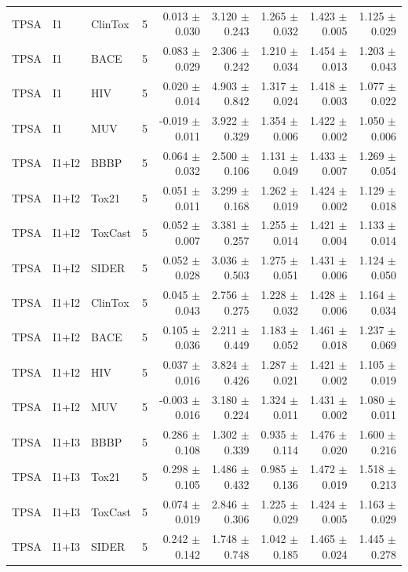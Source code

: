 \begin{landscape}
\begin{longtable}{lllrrrrrr}
TPSA & I1 & ClinTox & 5 & 0.013 $\pm$ 0.030 & 3.120 $\pm$ 0.243 & 1.265 $\pm$ 0.032 & 1.423 $\pm$ 0.005 & 1.125 $\pm$ 0.029 \\
TPSA & I1 & BACE & 5 & 0.083 $\pm$ 0.029 & 2.306 $\pm$ 0.242 & 1.210 $\pm$ 0.034 & 1.454 $\pm$ 0.013 & 1.203 $\pm$ 0.043 \\
TPSA & I1 & HIV & 5 & 0.020 $\pm$ 0.014 & 4.903 $\pm$ 0.842 & 1.317 $\pm$ 0.024 & 1.418 $\pm$ 0.003 & 1.077 $\pm$ 0.022 \\
TPSA & I1 & MUV & 5 & -0.019 $\pm$ 0.011 & 3.922 $\pm$ 0.329 & 1.354 $\pm$ 0.006 & 1.422 $\pm$ 0.002 & 1.050 $\pm$ 0.006 \\
TPSA & I1+I2 & BBBP & 5 & 0.064 $\pm$ 0.032 & 2.500 $\pm$ 0.106 & 1.131 $\pm$ 0.049 & 1.433 $\pm$ 0.007 & 1.269 $\pm$ 0.054 \\
TPSA & I1+I2 & Tox21 & 5 & 0.051 $\pm$ 0.011 & 3.299 $\pm$ 0.168 & 1.262 $\pm$ 0.019 & 1.424 $\pm$ 0.002 & 1.129 $\pm$ 0.018 \\
TPSA & I1+I2 & ToxCast & 5 & 0.052 $\pm$ 0.007 & 3.381 $\pm$ 0.257 & 1.255 $\pm$ 0.014 & 1.421 $\pm$ 0.004 & 1.133 $\pm$ 0.014 \\
TPSA & I1+I2 & SIDER & 5 & 0.052 $\pm$ 0.028 & 3.036 $\pm$ 0.503 & 1.275 $\pm$ 0.051 & 1.431 $\pm$ 0.006 & 1.124 $\pm$ 0.050 \\
TPSA & I1+I2 & ClinTox & 5 & 0.045 $\pm$ 0.043 & 2.756 $\pm$ 0.275 & 1.228 $\pm$ 0.032 & 1.428 $\pm$ 0.006 & 1.164 $\pm$ 0.034 \\
TPSA & I1+I2 & BACE & 5 & 0.105 $\pm$ 0.036 & 2.211 $\pm$ 0.449 & 1.183 $\pm$ 0.052 & 1.461 $\pm$ 0.018 & 1.237 $\pm$ 0.069 \\
TPSA & I1+I2 & HIV & 5 & 0.037 $\pm$ 0.016 & 3.824 $\pm$ 0.426 & 1.287 $\pm$ 0.021 & 1.421 $\pm$ 0.002 & 1.105 $\pm$ 0.019 \\
TPSA & I1+I2 & MUV & 5 & -0.003 $\pm$ 0.016 & 3.180 $\pm$ 0.224 & 1.324 $\pm$ 0.011 & 1.431 $\pm$ 0.002 & 1.080 $\pm$ 0.011 \\
TPSA & I1+I3 & BBBP & 5 & 0.286 $\pm$ 0.108 & 1.302 $\pm$ 0.339 & 0.935 $\pm$ 0.114 & 1.476 $\pm$ 0.020 & 1.600 $\pm$ 0.216 \\
TPSA & I1+I3 & Tox21 & 5 & 0.298 $\pm$ 0.105 & 1.486 $\pm$ 0.432 & 0.985 $\pm$ 0.136 & 1.472 $\pm$ 0.019 & 1.518 $\pm$ 0.213 \\
TPSA & I1+I3 & ToxCast & 5 & 0.074 $\pm$ 0.019 & 2.846 $\pm$ 0.306 & 1.225 $\pm$ 0.029 & 1.424 $\pm$ 0.005 & 1.163 $\pm$ 0.029 \\
TPSA & I1+I3 & SIDER & 5 & 0.242 $\pm$ 0.142 & 1.748 $\pm$ 0.748 & 1.042 $\pm$ 0.185 & 1.465 $\pm$ 0.024 & 1.445 $\pm$ 0.278 \\

\end{longtable}
\end{landscape}

